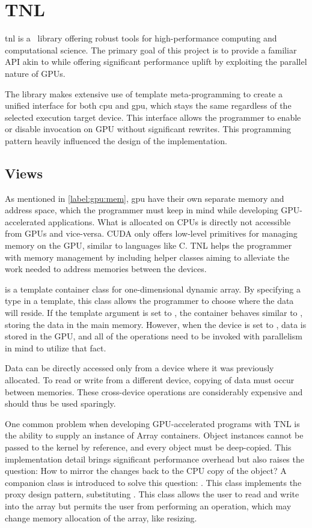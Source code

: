 \section{TNL}

\acrfull{tnl} \cite{tnl} is a \CC\ library offering robust tools for high-performance computing and computational science. The primary goal of this project is to provide a familiar API akin to  while offering significant performance uplift by exploiting the parallel nature of GPUs.

The library makes extensive use of template meta-programming to create a unified interface for both \acrshort{cpu} and \acrshort{gpu}, which stays the same regardless of the selected execution target device. This interface allows the programmer to enable or disable invocation on GPU without significant rewrites. This programming pattern heavily influenced the design of the implementation.

\subsection{Views}

As mentioned in \cref{label:gpu:mem}, \acrshort{gpu} have their own separate memory and address space, which the programmer must keep in mind while developing GPU-accelerated applications. What is allocated on CPUs is directly not accessible from GPUs and vice-versa. CUDA only offers low-level primitives for managing memory on the GPU, similar to languages like C. TNL helps the programmer with memory management by including helper classes aiming to alleviate the work needed to address memories between the devices.

 is a template container class for one-dimensional dynamic array. By specifying a type in a template, this class allows the programmer to choose where the data will reside. If the template argument is set to , the container behaves similar to , storing the data in the main memory. However, when the device is set to , data is stored in the GPU, and all of the operations need to be invoked with parallelism in mind to utilize that fact.

Data can be directly accessed only from a device where it was previously allocated. To read or write from a different device, copying of data must occur between memories. These cross-device operations are considerably expensive and should thus be used sparingly.

One common problem when developing GPU-accelerated programs with TNL is the ability to supply an instance of Array containers. Object instances cannot be passed to the kernel by reference, and every object must be deep-copied. This implementation detail brings significant performance overhead but also raises the question: How to mirror the changes back to the CPU copy of the object? A companion class is introduced to solve this question: . This class implements the proxy design pattern, substituting . This class allows the user to read and write into the array but permits the user from performing an operation, which may change memory allocation of the array, like resizing.
